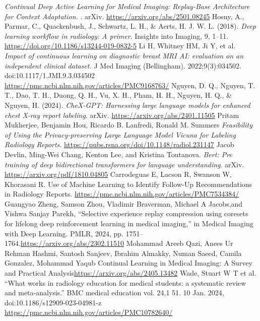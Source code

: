 \documentclass{IEEEcsmag}
\begin{document}
\begin{thebibliography}{31}
        \textit{Continual Deep Active Learning for Medical Imaging: Replay-Base Architecture for Context Adaptation.}
        . arXiv. \url{https://arxiv.org/abs/2501.08245}
        Hosny, A., Parmar, C., Quackenbush, J., Schwartz, L. H., \& Aerts, H. J. W. L. (2018). \textit{Deep learning workflow in radiology: A primer}. Insights into Imaging, 9, 1--11. \url{https://doi.org/10.1186/s13244-019-0832-5}
        Li H, Whitney HM, Ji Y, et al. 
        \textit{Impact of continuous learning on diagnostic breast MRI AI: evaluation on an independent clinical dataset.}
        J Med Imaging (Bellingham). 2022;9(3):034502. doi:10.1117/1.JMI.9.3.034502
        \url{https://pmc.ncbi.nlm.nih.gov/articles/PMC9168763/}
        Nguyen, D. Q., Nguyen, T. T., Dao, T. H., Duong, Q. H., Vu, X. H., Pham, H. H., Nguyen, H. Q., \& Nguyen, H. (2024). \textit{CheX-GPT: Harnessing large language models for enhanced chest X-ray report labeling}. arXiv. \url{https://arxiv.org/abs/2401.11505}
        Pritam Mukherjee, Benjamin Hou, Ricardo B. Lanfredi, Ronald M. Summers \textit{Feasibility of Using the Privacy-preserving Large Language Model Vicuna for Labeling Radiology Reports}. \url{https://pubs.rsna.org/doi/10.1148/radiol.231147}
        Jacob Devlin, Ming-Wei Chang, Kenton Lee, and Kristina Toutanova. \textit{Bert: Pre training of deep bidirectional transformers for language understanding}. arXiv. \url{https://arxiv.org/pdf/1810.04805}  
       Carrodeguas E, Lacson R, Swanson W, Khorasani R. Use of Machine Learning to Identify Follow-Up Recommendations in Radiology Reports. \url{https://pmc.ncbi.nlm.nih.gov/articles/PMC7534384/}
    Guangyao Zheng, Samson Zhou, Vladimir Braverman, Michael A Jacobs,and Vishwa Sanjay Parekh, “Selective experience replay compression using coresets for lifelong deep reinforcement learning in medical imaging,” in Medical Imaging with Deep Learning. PMLR, 2024, pp. 1751–1764.\url{https://arxiv.org/abs/2302.11510}
    Mohammad Areeb Qazi, Anees Ur Rehman Hashmi, Santosh Sanjeev, Ibrahim Almakky, Numan Saeed, Camila Gonzalez, Mohammad Yaqub Continual Learning in Medical Imaging: A Survey and Practical Analysis\url{https://arxiv.org/abs/2405.13482}
    Wade, Stuart W T et al. “What works in radiology education for medical students: a systematic review and meta-analysis.” BMC medical education vol. 24,1 51. 10 Jan. 2024, doi:10.1186/s12909-023-04981-z \url{https://pmc.ncbi.nlm.nih.gov/articles/PMC10782640/}

\end{thebibliography}
\end{document}
